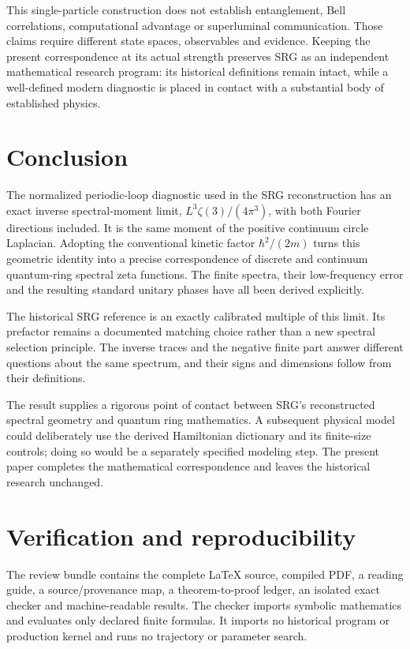 \documentclass[11pt,a4paper]{article}
\theoremstyle{definition}\newtheorem{definition}[theorem]{Definition}
\theoremstyle{remark}\newtheorem{remark}[theorem]{Remark}
\numberwithin{equation}{section}
\begin{document}
This single-particle construction does not establish entanglement,
Bell correlations, computational advantage or superluminal
communication. Those claims require different state spaces, observables
and evidence. Keeping the present correspondence at its actual strength
preserves SRG as an independent mathematical research program: its
historical definitions remain intact, while a well-defined modern
diagnostic is placed in contact with a substantial body of established
physics.

\section{Conclusion}\label{sec:conclusion}
The normalized periodic-loop diagnostic used in the SRG reconstruction
has an exact inverse spectral-moment limit,
\(L^3\zeta(3)/(4\pi^3)\), with both Fourier directions included.
It is the same moment of the positive continuum circle Laplacian.
Adopting the conventional kinetic factor \(\hbar^2/(2m)\) turns this
geometric identity into a precise correspondence of discrete and
continuum quantum-ring spectral zeta functions. The finite spectra,
their low-frequency error and the resulting standard unitary phases
have all been derived explicitly.

The historical SRG reference is an exactly calibrated multiple of this
limit. Its prefactor remains a documented matching choice rather than
a new spectral selection principle. The inverse traces and the
negative finite part answer different questions about the same
spectrum, and their signs and dimensions follow from their definitions.

The result supplies a rigorous point of contact between SRG's
reconstructed spectral geometry and quantum ring mathematics.
A subsequent physical model could deliberately use the derived
Hamiltonian dictionary and its finite-size controls; doing so would be
a separately specified modeling step. The present paper completes the
mathematical correspondence and leaves the historical research unchanged.

\appendix
\section{Verification and reproducibility}\label{app:verification}
The review bundle contains the complete LaTeX source, compiled PDF,
a reading guide, a source/provenance map, a theorem-to-proof ledger,
an isolated exact checker and machine-readable results.
The checker imports symbolic mathematics and evaluates only declared
finite formulas. It imports no historical program or production kernel
and runs no trajectory or parameter search.
\end{document}
